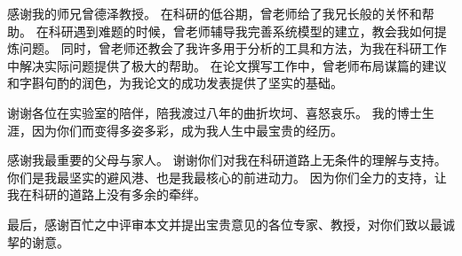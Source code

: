 \documentclass[format=draft,language=chinese,degree=phd,table,usenames,dvipsnames]{hustthesis}
\newcommand{\red}[1]{{\color{red}{#1}}}
\begin{document}
\begin{ack}
感谢我的师兄曾德泽教授。
在科研的低谷期，曾老师给了我兄长般的关怀和帮助。
在科研遇到难题的时候，曾老师辅导我完善系统模型的建立，教会我如何提炼问题。
同时，曾老师还教会了我许多用于分析的工具和方法，为我在科研工作中解决实际问题提供了极大的帮助。
在论文撰写工作中，曾老师布局谋篇的建议和字斟句酌的润色，为我论文的成功发表提供了坚实的基础。


\red{感谢实验室的吴松、余辰、刘海坤、陆枫、肖江、顾琳等老师，感谢李丁丁、李鹤等师兄，感谢郑龙、张宇、范学鹏、叶晨成、郭人通等同学。}
谢谢各位在实验室的陪伴，陪我渡过八年的曲折坎坷、喜怒哀乐。
我的博士生涯，因为你们而变得多姿多彩，成为我人生中最宝贵的经历。

感谢我最重要的父母与家人。
谢谢你们对我在科研道路上无条件的理解与支持。
你们是我最坚实的避风港、也是我最核心的前进动力。
因为你们全力的支持，让我在科研的道路上没有多余的牵绊。

最后，感谢百忙之中评审本文并提出宝贵意见的各位专家、教授，对你们致以最诚挈的谢意。


\end{ack}



\appendix
\end{document}
